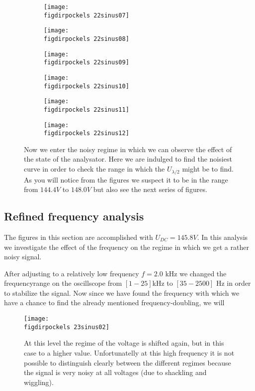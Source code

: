 \begin{figure}
    \begin{subfigure}[b]{\picwidth}
        \texttt{[image: \\figdirpockels 22sinus07]}
        \caption{}
    \end{subfigure}\qquad
    \begin{subfigure}[b]{\picwidth}
        \texttt{[image: \\figdirpockels 22sinus08]}
        \caption{}
    \end{subfigure}
    \begin{subfigure}[b]{\picwidth}
        \texttt{[image: \\figdirpockels 22sinus09]}
        \caption{}
    \end{subfigure}
    \begin{subfigure}[b]{\picwidth}
        \texttt{[image: \\figdirpockels 22sinus10]}
        \caption{}
    \end{subfigure}
    \begin{subfigure}[b]{\picwidth}
        \texttt{[image: \\figdirpockels 22sinus11]}
        \caption{}
    \end{subfigure}
    \begin{subfigure}[b]{\picwidth}
        \texttt{[image: \\figdirpockels 22sinus12]}
        \caption{}
    \end{subfigure}

    \caption{Now we enter the noisy regime in which we can 
        observe the effect of the state of the analysator. 
        Here we are indulged to find the noisiest curve in 
        order to check the range in which the $U_{\lambda / 2}$
        might be to find. As you will notice from the figures we
        suspect it to be in the range from $144.4V$ to $148.0V$
        but also see the next series of figures.}
    \label{fig:sinus2}
\end{figure}
\subsection{Refined frequency analysis}
The figures in this section are accomplished with $U_{DC}=145.8 V$.
In this analysis we investigate the effect of the frequency
on the regime in which we get a rather noisy signal. 

After
adjusting to a relatively low frequency $f=2.0$ kHz we changed
the frequencyrange on the oscillscope from 
$[1 - 25]$kHz to $[35 - 2500]$ Hz in order to stabilize the signal.
Now since we have found the frequency with which we have a chance
to find the already mentioned frequency-doubling, we will
\begin{figure}
    \texttt{[image: \\figdirpockels 23sinus02]}
    \caption{At this level the regime of the voltage is shifted
        again, but in this case to a higher value. Unfortunatelly
        at this high frequency it is not possible to distinguish
        clearly between the different regimes because the signal
        is very noisy at all voltages (due to shackling 
            and wiggling).}
\end{figure}
\clearpage
